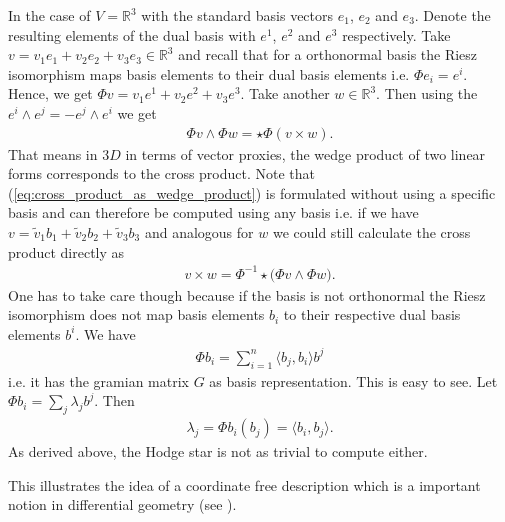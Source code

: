 \documentclass[12pt,a4paper]{article}
\numberwithin{equation}{subsection}
\numberwithin{lemma}{subsection}
\theoremstyle{definition}
\newcommand{\real}{\mathbb{R}}
\begin{document}
In the case of $V= \real^3$ with the standard basis
vectors $e_1$, $e_2$ and $e_3$. Denote the resulting elements 
of the dual basis with $e^1$, $e^2$ and $e^3$ respectively. 
Take $v = v_1 e_1 + v_2 e_2 + v_3 e_3 \in \real^3$ 
and recall that for a orthonormal basis the Riesz isomorphism maps basis 
elements to their dual basis elements i.e. $\Phi e_i = e^i$. Hence, 
we get $\Phi v = v_1 e^1 + v_2 e^2 + v_3 e^3$. Take another $w \in \real^3$.
Then using the $e^i \wedge e^j = - e^j \wedge e^i$ we get 
\begin{align}
    \Phi v \wedge \Phi w = \star \Phi (v \times w). 
    \label{eq:cross_product_as_wedge_product}
\end{align}
That means in $3D$ in terms of vector proxies, the wedge product 
of two linear forms corresponds to the cross product. Note that 
(\ref{eq:cross_product_as_wedge_product}) is formulated without using a 
specific basis and can therefore be computed using any basis i.e. 
if we have $v = \tilde{v}_1 b_1 + \tilde{v}_2 b_2 + \tilde{v}_3 b_3$ 
and analogous for $w$ we could still calculate the cross product directly as 
\begin{align*}
    v \times w = \Phi^{-1} \star \big(\Phi v \wedge \Phi w \big).
\end{align*}
One has to take care though because if the basis is not orthonormal 
the Riesz isomorphism does not map basis elements $b_i$ to their respective 
dual basis elements $b^i$. We have 
\begin{align*}
    \Phi b_i = \sum_{i=1}^{n} \langle b_j, b_i \rangle b^j
\end{align*}
i.e. it has the gramian matrix $G$ as basis representation. 
This is easy to 
see. Let $\Phi b_i = \sum_j \lambda_j b^j$. Then
\begin{align*}
    \lambda_j = \Phi b_i (b_j) = \langle b_i, b_j \rangle.
\end{align*}
As derived above, the Hodge star is not as trivial to compute either.

This illustrates the idea of a coordinate free description which is a important
notion in differential geometry (see \cite{}). 
\end{document}
